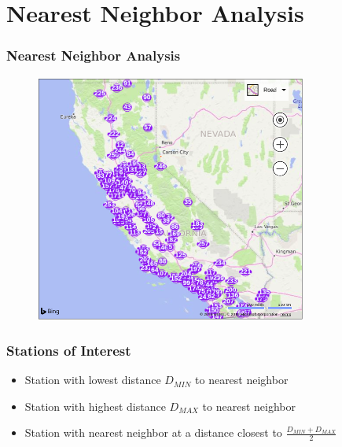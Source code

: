 \section{Nearest Neighbor Analysis}
\begin{frame}
\frametitle{Nearest Neighbor Analysis}
\end{frame}

\begin{frame}
\begin{figure}
\includegraphics[width=0.8\textwidth]{images/cimis-station-location}
\end{figure}
\end{frame}

\begin{frame}
\frametitle{Stations of Interest}
\begin{itemize}
	\setlength\itemsep{1em}
	\item Station with lowest distance $D_{MIN}$ to nearest neighbor
	\item Station with highest distance $D_{MAX}$ to nearest neighbor
	\item Station with nearest neighbor at a distance closest to $\frac{D_{MIN}+D_{MAX}}{2}$
\end{itemize}
\end{frame}

